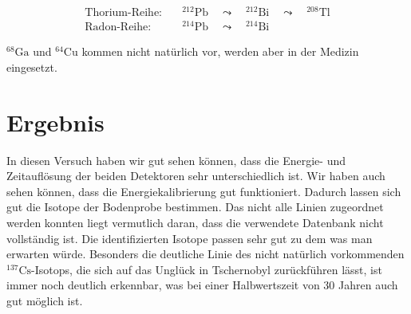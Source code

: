 \documentclass[11pt, ngerman, fleqn, DIV=15, headinclude, BCOR=2cm]{scrreprt}
\begin{document}
\begin{align*}
    \text{Thorium-Reihe:} & \quad ^{212}\text{Pb} \quad \leadsto \quad ^{212}\text{Bi}
     \quad\leadsto \quad ^{208}\text{Tl} \\
    \text{Radon-Reihe:} & \quad ^{214}\text{Pb} \quad \leadsto  \quad ^{214}\text{Bi}
\end{align*}

$^{68}\text{Ga}$ und $^{64}\text{Cu}$ kommen nicht natürlich vor, werden aber
in der Medizin eingesetzt.


\chapter{Ergebnis}

In diesen Versuch haben wir gut sehen können, dass die Energie- und Zeitauflösung der
beiden Detektoren sehr unterschiedlich ist. Wir haben auch sehen können, dass
die Energiekalibrierung gut funktioniert. 
Dadurch lassen sich gut die Isotope der Bodenprobe bestimmen. Das nicht
alle Linien zugeordnet werden konnten liegt vermutlich daran, dass die
verwendete Datenbank nicht vollständig ist. Die identifizierten Isotope passen
sehr gut zu dem was man erwarten würde. Besonders die deutliche Linie des
nicht natürlich vorkommenden $^{137}\text{Cs}$-Isotops, die sich auf das Unglück
in Tschernobyl zurückführen lässt, ist immer noch deutlich erkennbar, was bei
einer Halbwertszeit von 30 Jahren auch gut möglich ist.


\begin{appendix}


\end{appendix}
\end{document}
